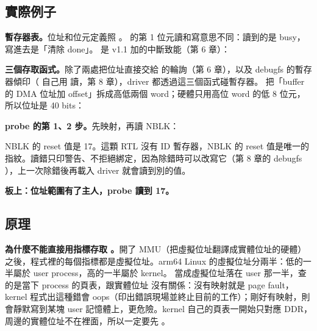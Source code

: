 \subsection{實際例子}

\textbf{暫存器表。}位址和位元定義照 。 的第 1 位元讀和寫意思不同：讀到的是 busy，寫進去是「清除 done」。 是 v1.1 加的中斷致能（第 6 章）：


\textbf{三個存取函式。}除了兩處把位址直接交給  的輪詢（第 6 章），以及 debugfs 的暫存器傾印（ 自己用  讀，第 8 章），driver 都透過這三個函式碰暫存器。 把「buffer 的 DMA 位址加 offset」拆成高低兩個 word；硬體只用高位 word 的低 8 位元，所以位址是 40 bits：


\textbf{probe 的第 1、2 步。}先映射，再讀 NBLK：


NBLK 的 reset 值是 17。這顆 RTL 沒有 ID 暫存器，NBLK 的 reset 值是唯一的指紋。讀錯只印警告、不拒絕綁定，因為除錯時可以改寫它（第 8 章的 debugfs ），上一次除錯後再載入 driver 就會讀到別的值。

\textbf{板上：位址範圍有了主人，probe 讀到 17。}


\subsection{原理}

\textbf{為什麼不能直接用指標存取 。}開了 MMU（把虛擬位址翻譯成實體位址的硬體）之後，程式裡的每個指標都是虛擬位址。arm64 Linux 的虛擬位址分兩半：低的一半屬於 user process，高的一半屬於 kernel。 當成虛擬位址落在 user 那一半，查的是當下 process 的頁表，跟實體位址  沒有關係：沒有映射就是 page fault，kernel 程式出這種錯會 oops（印出錯誤現場並終止目前的工作）；剛好有映射，則會靜默寫到某塊 user 記憶體上，更危險。kernel 自己的頁表一開始只對應 DDR，周邊的實體位址不在裡面，所以一定要先 。

\begin{center}
\end{center}

